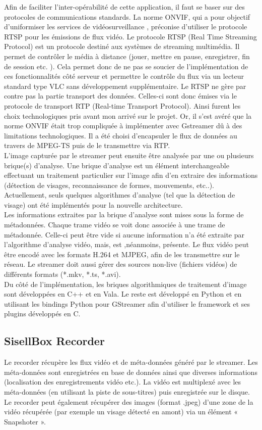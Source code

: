 Afin de faciliter l'inter-opérabilité de cette application, il faut se baser sur des protocoles de communications standards. La norme ONVIF, qui a pour objectif d'uniformiser les services de vidéosurveillance , préconise d'utiliser le protocole RTSP pour les émissions de flux vidéo. Le protocole RTSP (Real Time Streaming Protocol) est un protocole destiné aux systèmes de streaming multimédia. Il permet de contrôler le média à distance (jouer, mettre en pause, enregistrer, fin de session etc. ). Cela permet donc de ne pas se soucier de l’implémentation de ces fonctionnalités côté serveur et permettre le contrôle du flux via un lecteur standard type VLC sans développement supplémentaire. Le RTSP ne gère par contre pas la partie transport des données. Celles-ci sont donc émises via le protocole de transport RTP (Real-time Transport Protocol). Ainsi furent les choix technologiques pris avant mon arrivé sur le projet. Or, il s'est avéré que la norme ONVIF était trop compliquée à implémenter avec Gstreamer dû à des limitations technologiques. Il a été choisi d'encapsuler le flux de données au travers de MPEG-TS puis de le transmettre via RTP.\\
L’image capturée par le streamer peut ensuite être analysée par une ou plusieurs brique(s) d’analyse. Une brique d'analyse est un élément interchangeable effectuant un traitement particulier sur l'image afin d'en extraire des informations (détection de visages, reconnaissance de formes, mouvements, etc..). Actuellement, seuls quelques algorithmes d'analyse (tel que la détection de visage) ont été implémentés pour la nouvelle architecture.\\
Les informations extraites par la brique d'analyse sont mises sous la forme de métadonnées. Chaque trame vidéo se voit donc associée à une trame de métadonnée. Celle-ci peut être vide si aucune information n'a été extraite par l'algorithme d'analyse vidéo, mais, est ,néanmoins,  présente.
Le flux vidéo peut être encodé avec les formats H.264 et MJPEG, afin de les transmettre sur le réseau. Le streamer doit aussi gérer des sources non-live (fichiers vidéos) de différents formats (*.mkv, *.ts, *.avi).\\
Du côté de l'implémentation, les briques algorithmiques de traitement d'image sont développées en C++ et en Vala. Le reste est développé en Python et en utilisant les bindings Python pour GStreamer afin d'utiliser le framework et ses plugins développés en C.


\subsection{SisellBox Recorder}
Le recorder récupère les flux vidéo et de méta-données généré par le streamer. Les méta-données sont enregistrées en base de données ainsi que diverses informations (localisation des enregistrements vidéo etc.). La vidéo est multiplexé avec les méta-données (en utilisant la piste de sous-titres) puis enregistrée sur le disque. Le recorder peut également récupérer des images (format .jpeg) d'une zone de la vidéo récupérée (par exemple un visage détecté en amont) via un élément « Snapshoter ».

